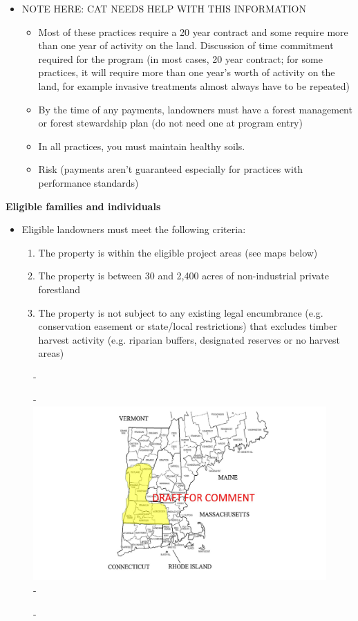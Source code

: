 \documentclass{article}\usepackage[]{graphicx}\usepackage[]{color}
\begin{document}
\begin{itemize}
  \item NOTE HERE: CAT NEEDS HELP WITH THIS INFORMATION
  \begin{itemize}
    \item Most of these practices require a 20 year contract and some require more than one year of activity on the land. Discussion of time commitment required for the program (in most cases, 20 year contract; for some practices, it will require more than one year’s worth of activity on the land, for example invasive treatments almost always have to be repeated)
    \item By the time of any payments, landowners must have a forest management or forest stewardship plan (do not need one at program entry)
    \item In all practices, you must maintain healthy soils.
    \item Risk (payments aren't guaranteed especially for practices with performance standards)
  \end{itemize}
  \end{itemize}
  
{\Large{\textbf{Eligible families and individuals}}}\\
\begin{itemize}
\item Eligible landowners must meet the following criteria:
  \begin{enumerate}
  \item The property is within the eligible project areas (see maps below)
  \item The property is between 30 and 2,400 acres of non-industrial private forestland
  \item The property is not subject to any existing legal encumbrance (e.g. conservation easement or
state/local restrictions) that excludes timber harvest activity (e.g. riparian buffers, designated reserves or no harvest areas)
  \end{enumerate}
\end{itemize}

{\begin{figure} [H]
  -\begin{center}
  -\includegraphics[width=14cm]{..//figures/programmapDRAFT.png}\label{fig:map}
  -\end{center}
  -\end{figure}}
\end{document}
